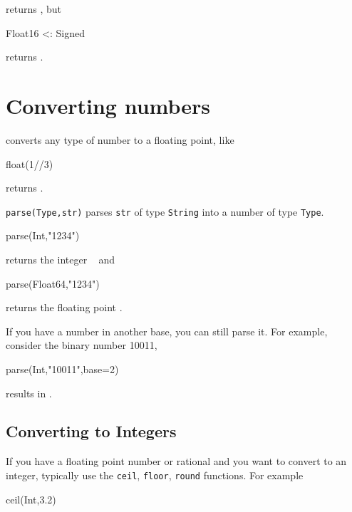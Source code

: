 returns  \printpythontex[verb], but

\begin{jlblock}[types]
Float16 <: Signed
\end{jlblock}

returns  \printpythontex[verb].


\section{Converting numbers}

 converts any type of number to a floating point, like

\begin{jlblock}
float(1//3)
\end{jlblock}
returns  \printpythontex[verb]. 

\texttt{parse(Type,str)} parses \texttt{str} of type \texttt{String}
into a number of type \texttt{Type}. 

\begin{jlblock}[types]
parse(Int,"1234")
\end{jlblock}

returns the integer \printpythontex[verb]~ and

\begin{jlblock}[types]
parse(Float64,"1234")
\end{jlblock}

returns the floating point \printpythontex[verb]. 

If you have a number in another base, you can still parse it.  For example, consider the binary number 10011, 
\begin{jlblock}[types]
parse(Int,"10011",base=2)
\end{jlblock}
results in  \printpythontex[verb].


\subsection{Converting to Integers}

If you have a floating point number or rational and you want to convert
to an integer, typically use the \texttt{ceil}, \texttt{floor},
\texttt{round} functions. For example

\begin{jlblock}[types]
ceil(Int,3.2)
\end{jlblock}

